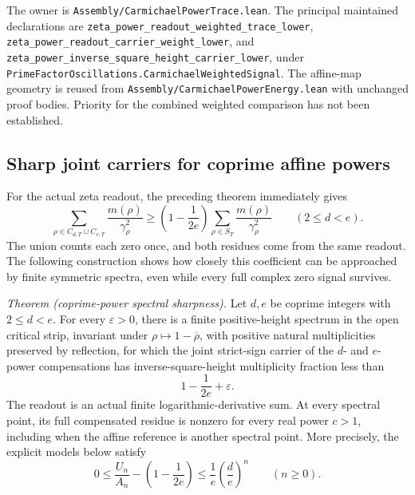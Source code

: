 The owner is \texttt{Assembly/CarmichaelPowerTrace.lean}.
The principal maintained declarations are
\texttt{zeta\_power\_readout\_weighted\_trace\_lower},
\texttt{zeta\_power\_readout\_carrier\_weight\_lower}, and
\texttt{zeta\_power\_inverse\_square\_height\_carrier\_lower}, under
\texttt{PrimeFactorOscillations.CarmichaelWeightedSignal}.
The affine-map geometry is reused from
\texttt{Assembly/CarmichaelPowerEnergy.lean} with unchanged proof bodies.
Priority for the combined weighted comparison has not been established.

\subsection{Sharp joint carriers for coprime affine powers}
\label{sec:coprime-power-carrier-sharpness}

For the actual zeta readout, the preceding theorem immediately gives
\[
 \sum_{\rho\in C_{d,T}\cup C_{e,T}}\frac{m(\rho)}{\gamma_\rho^2}
 \ge \left(1-\frac1{2e}\right)
       \sum_{\rho\in S_T}\frac{m(\rho)}{\gamma_\rho^2}
 \qquad(2\le d<e).
\]
The union counts each zero once, and both residues come from the same
readout. The following construction shows how closely this coefficient
can be approached by finite symmetric spectra, even while every full
complex zero signal survives.

\emph{Theorem (coprime-power spectral sharpness).}
Let \(d,e\) be coprime integers with \(2\le d<e\).
For every \(\varepsilon>0\), there is a finite positive-height spectrum
in the open critical strip, invariant under
\(\rho\mapsto1-\overline\rho\), with positive natural multiplicities
preserved by reflection, for which the joint strict-sign carrier of the
\(d\)- and \(e\)-power compensations has inverse-square-height
multiplicity fraction less than
\[
 1-\frac1{2e}+\varepsilon.
\]
The readout is an actual finite logarithmic-derivative sum.
At every spectral point, its full compensated residue is nonzero for
every real power \(c>1\), including when the affine reference is another
spectral point. More precisely, the explicit models below satisfy
\begin{equation}\label{eq:coprime-carrier-gap}
 0\le \frac{U_n}{A_n}-\left(1-\frac1{2e}\right)
 \le \frac1e\left(\frac de\right)^n
 \qquad(n\ge0).
\end{equation}

